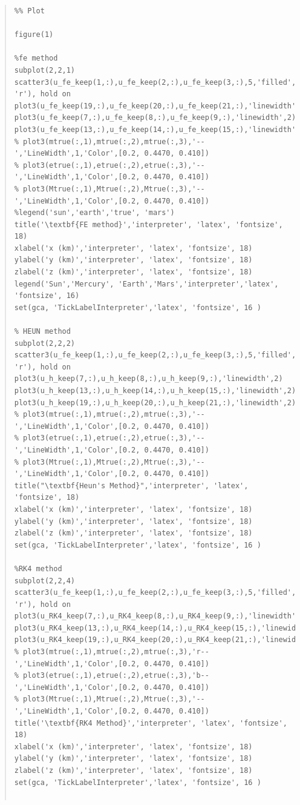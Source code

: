 \documentclass[conf]{new-aiaa}
\begin{document}
\begin{quote}
\begin{lstlisting}
%% Plot

figure(1)

%fe method
subplot(2,2,1)
scatter3(u_fe_keep(1,:),u_fe_keep(2,:),u_fe_keep(3,:),5,'filled', 'r'), hold on
plot3(u_fe_keep(19,:),u_fe_keep(20,:),u_fe_keep(21,:),'linewidth',2)
plot3(u_fe_keep(7,:),u_fe_keep(8,:),u_fe_keep(9,:),'linewidth',2)
plot3(u_fe_keep(13,:),u_fe_keep(14,:),u_fe_keep(15,:),'linewidth',2)
% plot3(mtrue(:,1),mtrue(:,2),mtrue(:,3),'--','LineWidth',1,'Color',[0.2, 0.4470, 0.410])
% plot3(etrue(:,1),etrue(:,2),etrue(:,3),'--','LineWidth',1,'Color',[0.2, 0.4470, 0.410])
% plot3(Mtrue(:,1),Mtrue(:,2),Mtrue(:,3),'--','LineWidth',1,'Color',[0.2, 0.4470, 0.410])
%legend('sun','earth','true', 'mars')
title('\textbf{FE method}','interpreter', 'latex', 'fontsize', 18)
xlabel('x (km)','interpreter', 'latex', 'fontsize', 18)
ylabel('y (km)','interpreter', 'latex', 'fontsize', 18)
zlabel('z (km)','interpreter', 'latex', 'fontsize', 18)
legend('Sun','Mercury', 'Earth','Mars','interpreter','latex', 'fontsize', 16)
set(gca, 'TickLabelInterpreter','latex', 'fontsize', 16 )

% HEUN method
subplot(2,2,2) 
scatter3(u_fe_keep(1,:),u_fe_keep(2,:),u_fe_keep(3,:),5,'filled', 'r'), hold on
plot3(u_h_keep(7,:),u_h_keep(8,:),u_h_keep(9,:),'linewidth',2)
plot3(u_h_keep(13,:),u_h_keep(14,:),u_h_keep(15,:),'linewidth',2)
plot3(u_h_keep(19,:),u_h_keep(20,:),u_h_keep(21,:),'linewidth',2)
% plot3(mtrue(:,1),mtrue(:,2),mtrue(:,3),'--','LineWidth',1,'Color',[0.2, 0.4470, 0.410])
% plot3(etrue(:,1),etrue(:,2),etrue(:,3),'--','LineWidth',1,'Color',[0.2, 0.4470, 0.410])
% plot3(Mtrue(:,1),Mtrue(:,2),Mtrue(:,3),'--','LineWidth',1,'Color',[0.2, 0.4470, 0.410])
title("\textbf{Heun's Method}",'interpreter', 'latex', 'fontsize', 18)
xlabel('x (km)','interpreter', 'latex', 'fontsize', 18)
ylabel('y (km)','interpreter', 'latex', 'fontsize', 18)
zlabel('z (km)','interpreter', 'latex', 'fontsize', 18)
set(gca, 'TickLabelInterpreter','latex', 'fontsize', 16 )

%RK4 method
subplot(2,2,4)
scatter3(u_fe_keep(1,:),u_fe_keep(2,:),u_fe_keep(3,:),5,'filled', 'r'), hold on
plot3(u_RK4_keep(7,:),u_RK4_keep(8,:),u_RK4_keep(9,:),'linewidth',2)
plot3(u_RK4_keep(13,:),u_RK4_keep(14,:),u_RK4_keep(15,:),'linewidth',2)
plot3(u_RK4_keep(19,:),u_RK4_keep(20,:),u_RK4_keep(21,:),'linewidth',2)
% plot3(mtrue(:,1),mtrue(:,2),mtrue(:,3),'r--','LineWidth',1,'Color',[0.2, 0.4470, 0.410])
% plot3(etrue(:,1),etrue(:,2),etrue(:,3),'b--','LineWidth',1,'Color',[0.2, 0.4470, 0.410])
% plot3(Mtrue(:,1),Mtrue(:,2),Mtrue(:,3),'--','LineWidth',1,'Color',[0.2, 0.4470, 0.410])
title('\textbf{RK4 Method}','interpreter', 'latex', 'fontsize', 18)
xlabel('x (km)','interpreter', 'latex', 'fontsize', 18)
ylabel('y (km)','interpreter', 'latex', 'fontsize', 18)
zlabel('z (km)','interpreter', 'latex', 'fontsize', 18)
set(gca, 'TickLabelInterpreter','latex', 'fontsize', 16 )


\end{lstlisting}
\end{quote}
\end{document}
